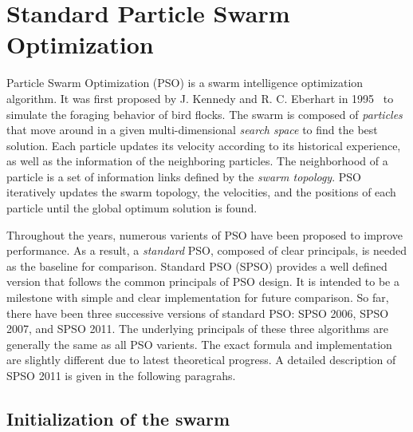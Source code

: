 \section{Standard Particle Swarm Optimization}

Particle Swarm Optimization (PSO) is a swarm intelligence optimization algorithm. 
It was first proposed by J. Kennedy and R. C. Eberhart in 1995~\cite{Kennedy:1995:PSO} to simulate the foraging behavior of bird flocks.
The swarm is composed of \textit{particles} that move around in a given multi-dimensional \textit{search space} to find the best solution.
Each particle updates its velocity according to its historical experience, as well as the information of the neighboring particles.
The neighborhood of a particle is a set of information links defined by the \textit{swarm topology}. %
PSO iteratively updates the swarm topology, the velocities, and the positions of each particle until the global optimum solution is found.


Throughout the years, numerous varients of PSO have been proposed to improve performance.
As a result, a \textit{standard} PSO, composed of clear principals, is needed as the baseline for comparison.
Standard PSO (SPSO) provides a well defined version that follows the common principals of PSO design.
It is intended to be a milestone with simple and clear implementation for future comparison. %
So far, there have been three successive versions of standard PSO: SPSO 2006, SPSO 2007, and SPSO 2011.
The underlying principals of these three algorithms are generally the same as all PSO varients.
The exact formula and implementation are slightly different due to latest theoretical progress.
A detailed description of SPSO 2011 is given in the following paragrahs.

\subsection{Initialization of the swarm}


